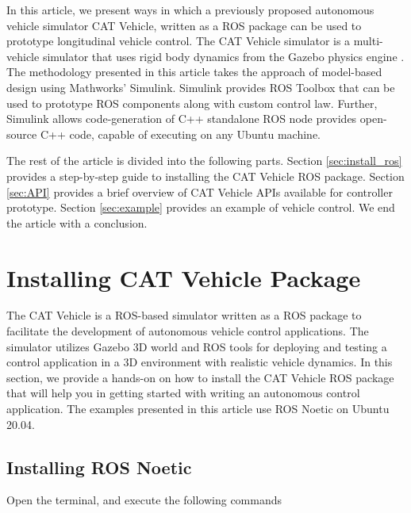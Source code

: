 \documentclass[
]{article}
\begin{document}
In this article, we present ways in which a previously proposed
autonomous vehicle simulator CAT Vehicle, written as a ROS package
\autocite{quigley2009ros} can be used to prototype longitudinal vehicle
control. The CAT Vehicle simulator is a multi-vehicle simulator that
uses rigid body dynamics from the Gazebo physics engine
\autocite{koenig2004design}. The methodology presented in this article
takes the approach of model-based design using Mathworks' Simulink.
Simulink provides ROS Toolbox that can be used to prototype ROS
components along with custom control law. Further, Simulink allows
code-generation of C++ standalone ROS node provides open-source C++
code, capable of executing on any Ubuntu machine.

The rest of the article is divided into the following parts. Section
\ref{sec:install_ros} provides a step-by-step guide to installing the
CAT Vehicle ROS package. Section \ref{sec:API} provides a brief overview
of CAT Vehicle APIs available for controller prototype. Section
\ref{sec:example} provides an example of vehicle control. We end the
article with a conclusion.

\hypertarget{installing-cat-vehicle-package}{%
\section{Installing CAT Vehicle
Package}\label{installing-cat-vehicle-package}}

\label{sec:install_ros} The CAT Vehicle is a ROS-based simulator written
as a ROS package to facilitate the development of autonomous vehicle
control applications. The simulator utilizes Gazebo 3D world and ROS
tools for deploying and testing a control application in a 3D
environment with realistic vehicle dynamics. In this section, we provide
a hands-on on how to install the CAT Vehicle ROS package that will help
you in getting started with writing an autonomous control application.
The examples presented in this article use ROS Noetic on Ubuntu 20.04.

\hypertarget{installing-ros-noetic}{%
\subsection{Installing ROS Noetic}\label{installing-ros-noetic}}

Open the terminal, and execute the following commands
\end{document}
